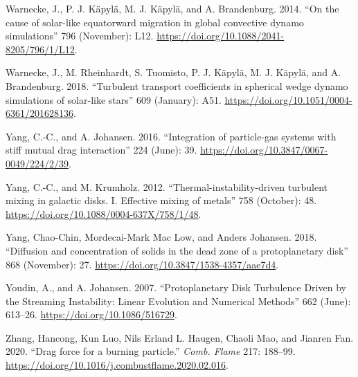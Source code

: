 \documentclass[10pt,a4paper,onecolumn]{article}
\begin{document}
\leavevmode\hypertarget{ref-2014ApJ.796L.12W}{}%
Warnecke, J., P. J. Käpylä, M. J. Käpylä, and A. Brandenburg. 2014. ``On
the cause of solar-like equatorward migration in global convective
dynamo simulations'' 796 (November): L12.
\url{https://doi.org/10.1088/2041-8205/796/1/L12}.

\leavevmode\hypertarget{ref-2018Aux5cux26A.609A.51W}{}%
Warnecke, J., M. Rheinhardt, S. Tuomisto, P. J. Käpylä, M. J. Käpylä,
and A. Brandenburg. 2018. ``Turbulent transport coefficients in
spherical wedge dynamo simulations of solar-like stars'' 609 (January):
A51. \url{https://doi.org/10.1051/0004-6361/201628136}.

\leavevmode\hypertarget{ref-2016ApJS.224.39Y}{}%
Yang, C.-C., and A. Johansen. 2016. ``Integration of particle-gas
systems with stiff mutual drag interaction'' 224 (June): 39.
\url{https://doi.org/10.3847/0067-0049/224/2/39}.

\leavevmode\hypertarget{ref-2012ApJ.758.48Y}{}%
Yang, C.-C., and M. Krumholz. 2012. ``Thermal-instability-driven
turbulent mixing in galactic disks. I. Effective mixing of metals'' 758
(October): 48. \url{https://doi.org/10.1088/0004-637X/758/1/48}.

\leavevmode\hypertarget{ref-2018ApJ.868.27Y}{}%
Yang, Chao-Chin, Mordecai-Mark Mac Low, and Anders Johansen. 2018.
``Diffusion and concentration of solids in the dead zone of a
protoplanetary disk'' 868 (November): 27.
\url{https://doi.org/10.3847/1538-4357/aae7d4}.

\leavevmode\hypertarget{ref-2007ApJ.662.613Y}{}%
Youdin, A., and A. Johansen. 2007. ``Protoplanetary Disk Turbulence
Driven by the Streaming Instability: Linear Evolution and Numerical
Methods'' 662 (June): 613--26. \url{https://doi.org/10.1086/516729}.

\leavevmode\hypertarget{ref-Zhang_etal_2020comb}{}%
Zhang, Hancong, Kun Luo, Nils Erland L. Haugen, Chaoli Mao, and Jianren
Fan. 2020. ``Drag force for a burning particle.'' \emph{Comb. Flame}
217: 188--99. \url{https://doi.org/10.1016/j.combustflame.2020.02.016}.
\end{document}
